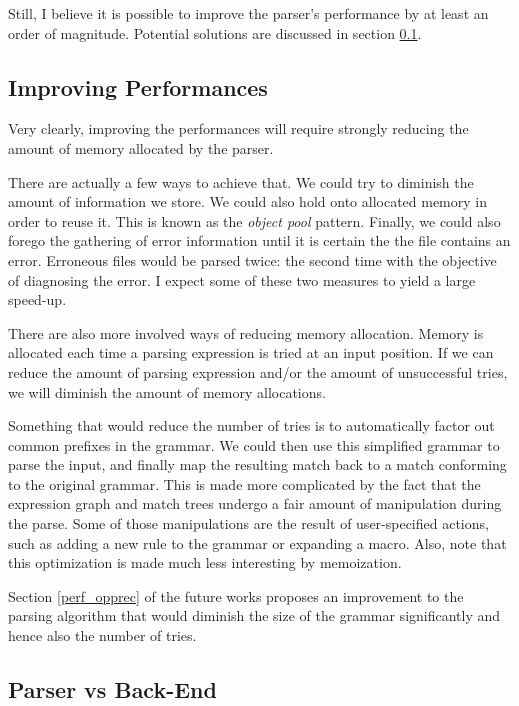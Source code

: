 Still, I believe it is possible to improve the parser's performance by at least
an order of magnitude. Potential solutions are discussed in section
\ref{improve_perf}.

\subsection{Improving Performances}
\label{improve_perf}

Very clearly, improving the performances will require strongly reducing the
amount of memory allocated by the parser.

There are actually a few ways to achieve that. We could try to diminish the
amount of information we store. We could also hold onto allocated memory in
order to reuse it. This is known as the \emph{object pool} pattern. Finally, we
could also forego the gathering of error information until it is certain the the
file contains an error. Erroneous files would be parsed twice: the second time
with the objective of diagnosing the error. I expect some of these two measures
to yield a large speed-up.

There are also more involved ways of reducing memory allocation. Memory is
allocated each time a parsing expression is tried at an input position. If we
can reduce the amount of parsing expression and/or the amount of unsuccessful
tries, we will diminish the amount of memory allocations.

Something that would reduce the number of tries is to automatically factor out
common prefixes in the grammar. We could then use this simplified grammar to
parse the input, and finally map the resulting match back to a match conforming
to the original grammar. This is made more complicated by the fact that the
expression graph and match trees undergo a fair amount of manipulation during
the parse. Some of those manipulations are the result of user-specified actions,
such as adding a new rule to the grammar or expanding a macro. Also, note that
this optimization is made much less interesting by memoization.

Section \ref{perf_opprec} of the future works proposes an improvement to the
parsing algorithm that would diminish the size of the grammar significantly and
hence also the number of tries.

\subsection{Parser vs Back-End}
\label{parser_backend}

